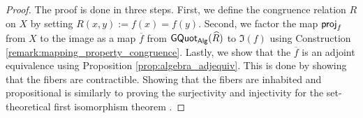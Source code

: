 \begin{proof}
The proof is done in three steps.
First, we define the congruence relation $R$ on $X$ by setting $R(x, y) := f(x) = f(y)$.
Second, we factor the map $\mathsf{proj}_{f}$ from $X$ to the image as a map $\overline{f}$ from $\mathsf{GQuot}_{\mathsf{Alg}}(\widehat{R})$ to $\Im(f)$ using Construction \ref{remark:mapping_property_congruence}.
Lastly, we show that the $\overline{f}$ is an adjoint equivalence using Proposition \ref{prop:algebra_adjequiv}.
This is done by showing that the fibers are contractible.
Showing that the fibers are inhabited and propositional is similarly to proving the surjectivity and injectivity for the set-theoretical first isomorphism theorem \cite{lynge2019}.
\end{proof}
